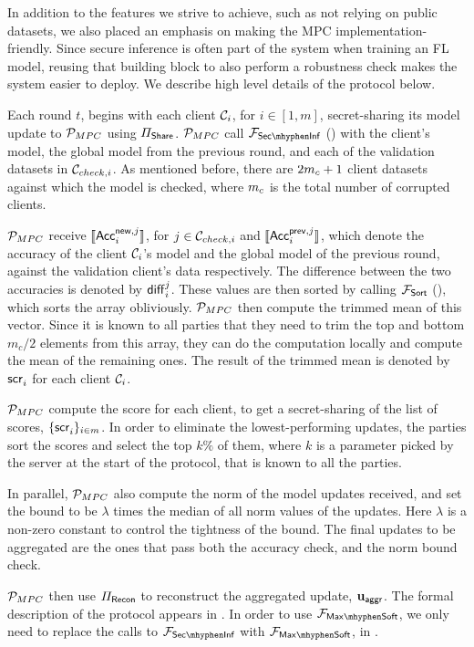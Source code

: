 In addition to the features we strive to achieve, such as not relying on public datasets, we also placed an emphasis on making the MPC implementation-friendly. Since secure inference is often part of the system when training an FL model, reusing that building block to also perform a robustness check makes the system easier to deploy. We describe high level details of the protocol below.

Each round $t$, begins with each client $\calC_i$, for $i \in [1, m]$, secret-sharing its model update to $\mpcnodes$ using $\PShare$. $\mpcnodes$ call $\FSecInf$ () with the client's model, the global model from the previous round, and each of the validation datasets in $\calC_{check, i}$. As mentioned before, there are $2 \cor + 1$ client datasets against which the model is checked, where $\cor$ is the total number of corrupted clients. 

$\mpcnodes$ receive $\arith{\Acc{i}{\msf{new}, j}}$, for $j \in \calC_{check, i}$ and $\arith{\Acc{i}{\msf{prev}, j}}$, which denote the accuracy of the client $\calC_i$'s model and the global model of the previous round, against the validation client's data respectively. The difference between the two accuracies is denoted by $\diff{i}{j}$. These values are then sorted by calling $\FSort$ (), which sorts the array obliviously. $\mpcnodes$ then compute the trimmed mean of this vector. Since it is known to all parties that they need to trim the top and bottom $m_c/2$ elements from this array, they can do the computation locally and compute the mean of the remaining ones. The result of the trimmed mean is denoted by $\score{i}{}$ for each client $\calC_i$.

$\mpcnodes$ compute the score for each client, to get a secret-sharing of the list of scores, $\{ \score{i}{} \}_{i \in m}$. In order to eliminate the lowest-performing updates, the parties sort the scores and select the top $k \%$ of them, where $k$ is a parameter picked by the server at the start of the protocol, that is known to all the parties.

In parallel, $\mpcnodes$ also compute the norm of the model updates received, and set the bound to be $\lambda$ times the median of all norm values of the updates. Here $\lambda$ is a non-zero constant to control the tightness of the bound. The final updates to be aggregated are the ones that pass both the accuracy check, and the norm bound check.

$\mpcnodes$ then use $\PRec$ to reconstruct the aggregated update, $\bfu_{\msf{aggr}}$. The formal description of the protocol appears in . In order to use $\FMaxSoft$, we only need to replace the calls to $\FSecInf$ with $\FMaxSoft$, in .
